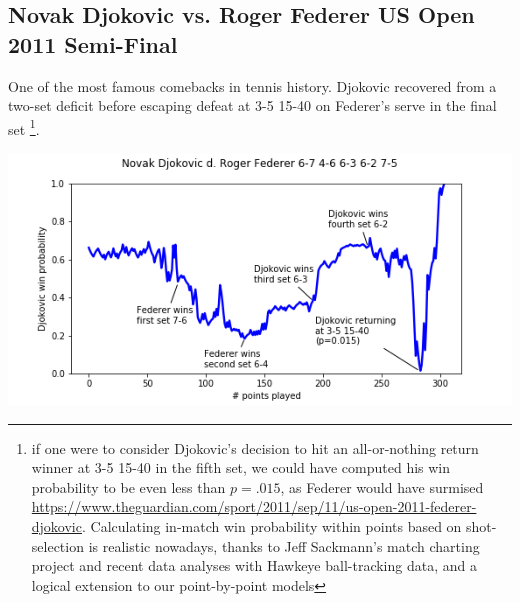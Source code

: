 \documentclass[chapterprefix=false]{report}
\begin{document}
\subsection{Novak Djokovic vs. Roger Federer US Open 2011 Semi-Final}

One of the most famous comebacks in tennis history. Djokovic recovered from a two-set deficit before escaping defeat at 3-5 15-40 on Federer's serve in the final set \footnote{if one were to consider Djokovic's decision to hit an all-or-nothing return winner at 3-5 15-40 in the fifth set, we could have computed his win probability to be even less than $p=.015$, as Federer would have surmised \url{https://www.theguardian.com/sport/2011/sep/11/us-open-2011-federer-djokovic}. Calculating in-match win probability within points based on shot-selection is realistic nowadays, thanks to Jeff Sackmann's match charting project and recent data analyses with Hawkeye ball-tracking data, and a logical extension to our point-by-point models}.

\includegraphics[scale=.7]{djokovic_federer_uso_11}






\end{document}
